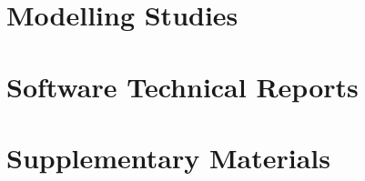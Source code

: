 \documentclass{ut-thesis}
\begin{document}



\part{Modelling Studies}






\part{Software Technical Reports}




\part{Supplementary Materials}












\end{document}
